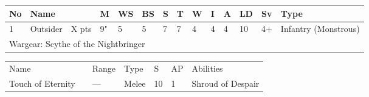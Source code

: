 \newpage
{}

\noindent
\begin{tabular}{||m{10pt} m{95pt} m{30pt} m{11pt} m{11pt} m{11pt} m{11pt} m{11pt} m{11pt} m{11pt} m{11pt} m{11pt} m{11pt} m{125pt}||}
	\hline
	No & Name & & M & WS & BS & S & T & W & I & A & LD & Sv & Type \\
	\hline
	1 & Outsider & X pts & 9" & 5 & 5 & 7 & 7 & 4 & 4 & 4 & 10 & 4+ & Infantry (Monstrous)\\
	\hline
	\hline
	\multicolumn{14}{||Z{532 pt}||}{Wargear: Scythe of the Nightbringer}\\
	\hline
\end{tabular}

\noindent
\begin{tabular}{||m{140pt} m{0pt} m{31pt} m{55pt} m{12pt} m{12pt} m{210pt}||}
	\hline
	Name & & Range & Type & S & AP & Abilities \\
	Touch of Eternity & & — & Melee & 10 & 1 & Shroud of Despair \\
	\hline	
	\hline
\end{tabular}

